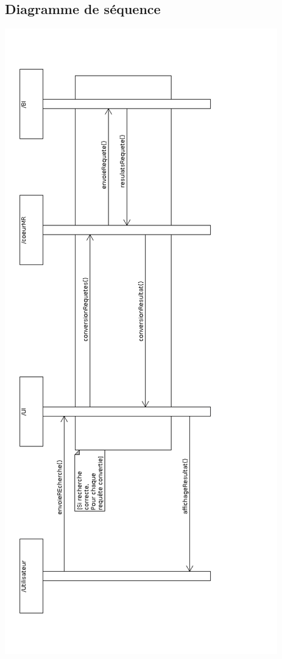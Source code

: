 \documentclass[a4paper,12pt]{report}
\begin{document}
\subsection{Diagramme de séquence}\label{sequence-recherche}
\begin{center}
\includegraphics[scale=0.41]{"images/sequence_util"}
\end{center}
\end{document}
